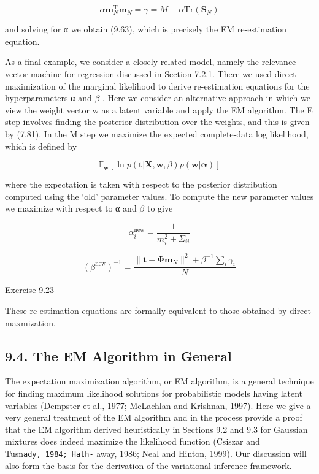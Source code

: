 \documentclass[
  10
]{article}
\begin{document}
\[
\alpha \mathbf {m} _ {N} ^ {\mathrm{T}} \mathbf {m} _ {N} = \gamma = M - \alpha \mathrm{Tr} (\mathbf {S} _ {N})\tag{9.65}
\]

and solving for α we obtain (9.63), which is precisely the EM
re-estimation equation.

As a final example, we consider a closely related model, namely the
relevance vector machine for regression discussed in Section 7.2.1.
There we used direct maximization of the marginal likelihood to derive
re-estimation equations for the hyperparameters α and \(\beta\) . Here
we consider an alternative approach in which we view the weight vector w
as a latent variable and apply the EM algorithm. The E step involves
finding the posterior distribution over the weights, and this is given
by (7.81). In the M step we maximize the expected complete-data log
likelihood, which is defined by

\[
\mathbb {E} _ {\mathbf {w}} \left[ \ln p (\mathbf {t} | \mathbf {X}, \mathbf {w}, \beta) p (\mathbf {w} | \boldsymbol {\alpha}) \right]\tag{9.66}
\]

where the expectation is taken with respect to the posterior
distribution computed using the `old' parameter values. To compute the
new parameter values we maximize with respect to α and \(\beta\) to give

\[
\alpha_ {i} ^ {\mathrm{new}} = \frac {1}{m _ {i} ^ {2} + \Sigma_ {i i}}\tag{9.67}
\]

\[
(\beta^ {\mathrm{new}}) ^ {- 1} = \frac {\| \mathbf {t} - \boldsymbol {\Phi} \mathbf {m} _ {N} \| ^ {2} + \beta^ {- 1} \sum_ {i} \gamma_ {i}}{N}\tag{9.68}
\]

Exercise 9.23

These re-estimation equations are formally equivalent to those obtained
by direct maxmization.

\subsection{9.4. The EM Algorithm in
General}\label{the-em-algorithm-in-general}

The expectation maximization algorithm, or EM algorithm, is a general
technique for finding maximum likelihood solutions for probabilistic
models having latent variables (Dempster et al., 1977; McLachlan and
Krishnan, 1997). Here we give a very general treatment of the EM
algorithm and in the process provide a proof that the EM algorithm
derived heuristically in Sections 9.2 and 9.3 for Gaussian mixtures does
indeed maximize the likelihood function (Csiszar and
Tusn\texttt{ady,\ 1984;\ Hath-} away, 1986; Neal and Hinton, 1999). Our
discussion will also form the basis for the derivation of the
variational inference framework.
\end{document}
